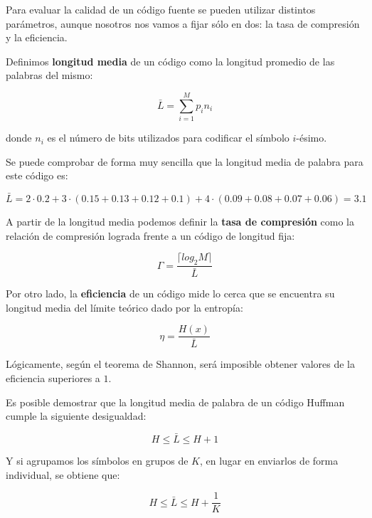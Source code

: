 \documentclass[es,apuntes]{uah}
\begin{document}
Para evaluar la calidad de un código fuente se pueden utilizar distintos parámetros, aunque nosotros nos vamos a fijar sólo en dos: la tasa de compresión y la eficiencia. 

Definimos {\bf longitud media} de un código como la longitud promedio de las palabras del mismo:

\begin{equation}
\bar{L} = \sum_{i=1}^M p_i n_i	
\end{equation}

donde $n_i$ es el número de bits utilizados para codificar el símbolo $i$-ésimo. 

Se puede comprobar de forma muy sencilla que la longitud media de palabra para este código es:

\begin{displaymath}
	\bar{L} = 2\cdot 0.2 + 3 \cdot (0.15 + 0.13 + 0.12 + 0.1) + 4 \cdot (0.09 + 0.08 + 0.07 + 0.06) = 3.1
\end{displaymath}

A partir de la longitud media podemos definir la {\bf tasa de compresión} como la relación de compresión lograda frente a un código de longitud fija:

\begin{equation}
	\Gamma = \frac{\lceil log_2 M \rceil}{\bar{L}}
\end{equation}

Por otro lado, la {\bf eficiencia} de un código mide lo cerca que se encuentra su longitud media del límite teórico dado por la entropía:

\begin{equation}
	\eta = \frac{H(x)}{\bar{L}}
\end{equation}

Lógicamente, según el teorema de Shannon, será imposible obtener valores de la eficiencia superiores a $1$. 

Es posible demostrar que la longitud media de palabra de un código Huffman cumple la siguiente desigualdad:

\begin{equation}
	H \leq \bar{L} \leq H+1
\end{equation}

Y si agrupamos los símbolos en grupos de $K$, en lugar en enviarlos de forma individual, se obtiene que:

\begin{equation}
	H \leq \bar{L} \leq H + \frac{1}{K}
\end{equation}
\end{document}

